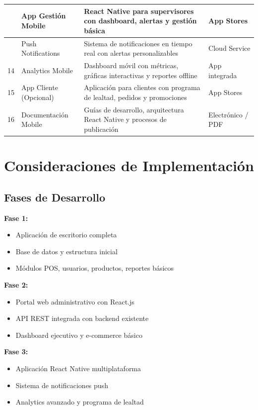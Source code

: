 \documentclass[12pt,letterpaper]{article}
\begin{document}
\begin{longtable}{|>{\centering}p{1cm}|p{6cm}|p{8cm}|>{\centering\arraybackslash}p{3cm}|}
12 & App Gestión Mobile & React Native para supervisores con dashboard, alertas y gestión básica & App Stores \\
\hline

13 & Push Notifications & Sistema de notificaciones en tiempo real con alertas personalizables & Cloud Service \\
\hline

14 & Analytics Mobile & Dashboard móvil con métricas, gráficas interactivas y reportes offline & App integrada \\
\hline

15 & App Cliente (Opcional) & Aplicación para clientes con programa de lealtad, pedidos y promociones & App Stores \\
\hline

16 & Documentación Mobile & Guías de desarrollo, arquitectura React Native y procesos de publicación & Electrónico / PDF \\
\hline
\end{longtable}

\section{Consideraciones de Implementación}

\subsection{Fases de Desarrollo}
\textbf{Fase 1:}
\begin{itemize}
    \item Aplicación de escritorio completa
    \item Base de datos y estructura inicial
    \item Módulos POS, usuarios, productos, reportes básicos
\end{itemize}

\textbf{Fase 2:}
\begin{itemize}
    \item Portal web administrativo con React.js
    \item API REST integrada con backend existente
    \item Dashboard ejecutivo y e-commerce básico
\end{itemize}

\textbf{Fase 3:}
\begin{itemize}
    \item Aplicación React Native multiplataforma
    \item Sistema de notificaciones push
    \item Analytics avanzado y programa de lealtad
\end{itemize}
\end{document}
